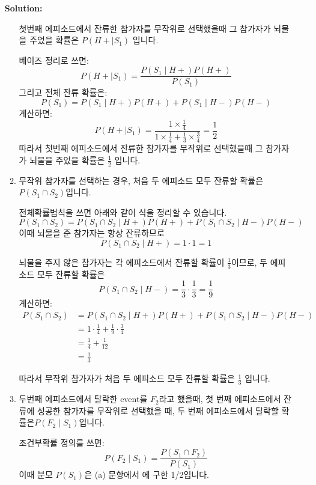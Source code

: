\documentclass{article}
\newenvironment{solution}
{
    \par\medskip
    \noindent\textbf{Solution:}
    \begin{adjustwidth}{1em}{0em}
}
{
    \end{adjustwidth}
    \medskip
}
\begin{document}
\begin{enumerate}[label=\textbf{\arabic*.}, leftmargin=*]
\begin{solution}
\begin{enumerate}[label=(\alph*), leftmargin=2em, itemsep=1em]
        첫번째 에피소드에서 잔류한 참가자를 무작위로 선택했을때 그 참가자가 뇌물을 주었을 확률은 $P(H+\mid S_1)$ 입니다.
        
        베이즈 정리로 쓰면:  
        $$  
        P(H+\mid S_1)=\frac{P(S_1\mid H+)P(H+)}{P(S_1)}  
        $$  
        그리고 전체 잔류 확률은:  
        $$  
        P(S_1)=P(S_1\mid H+)P(H+)+P(S_1\mid H-)P(H-)  
        $$  
        계산하면:  
        $$  
        P(H+\mid S_1)=\frac{1\times\frac14}{1\times\frac14+\frac13\times\frac34}=\frac12  
        $$
        따라서 첫번째 에피소드에서 잔류한 참가자를 무작위로 선택했을때 그 참가자가 뇌물을 주었을 확률은 $\frac{1}{2}$ 입니다.

\newpage
        \item 무작위 참가자를 선택하는 경우, 처음 두 에피소드 모두 잔류할 확률은  $P(S_1\cap S_2)$입니다.  
        
        전체확률법칙을 쓰면 아래와 같이 식을 정리할 수 있습니다.  
        $$  
        P(S_1\cap S_2)=P(S_1\cap S_2\mid H+)P(H+)+P(S_1\cap S_2\mid H-)P(H-)  
        $$ 
        이때 뇌물을 준 참가자는 항상 잔류하므로 
        $$P(S_1\cap S_2\mid H+)=1\cdot1=1$$
        
        뇌물을 주지 않은 참가자는 각 에피소드에서 잔류할 확률이 $\frac13$이므로, 두 에피소드 모두 잔류할 확률은  
        $$  
        P(S_1\cap S_2\mid H-)=\frac13\cdot\frac13=\frac19  
        $$
        계산하면:         
        \begin{align*}
            P(S_1\cap S_2)
            &=P(S_1\cap S_2\mid H+)P(H+)+P(S_1\cap S_2\mid H-)P(H-)\\
            &=1\cdot\frac14+\frac19\cdot\frac34\\
            &=\frac14+\frac1{12}\\
            &=\frac13 
        \end{align*}
          
        따라서 무작위 참가자가 처음 두 에피소드 모두 잔류할 확률은 $\frac13$ 입니다.  
        

        \item 두번째 에피소드에서 탈락한 event를 $F_2$라고 했을때, 첫 번째 에피소드에서 잔류에 성공한 참가자를 무작위로 선택했을 때, 두 번째 에피소드에서 탈락할 확률은$P(F_2\mid S_1)$입니다.

        조건부확률 정의를 쓰면:  
        $$  
        P(F_2\mid S_1)=\frac{P(S_1\cap F_2)}{P(S_1)}  
        $$  
        이때 분모 $P(S_1)$은 (a) 문항에서 에 구한 1/2입니다.  
          

\end{enumerate}
\end{solution}
\end{enumerate}
\end{document}

